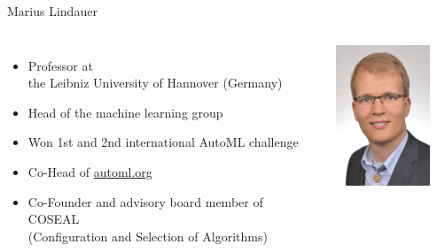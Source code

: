 \begin{frame}[c]{Marius Lindauer}

\begin{columns}
	
	
	\begin{itemize}
		\item Professor at\\ the Leibniz University of Hannover (Germany)
		\item Head of the machine learning group
		\item Won 1st and 2nd international AutoML challenge
		\item Co-Head of \url{automl.org}
		\item Co-Founder and advisory board member of COSEAL\\ (Configuration and Selection of Algorithms)
	\end{itemize}
	
	
	\includegraphics[width=0.8\textwidth]{images/lindauer.jpg}
	
\end{columns}

\end{frame}
